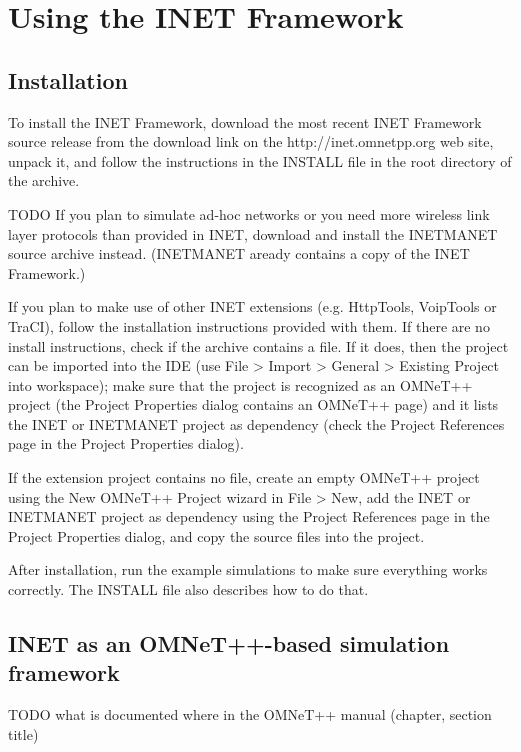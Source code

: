 \chapter{Using the INET Framework}
\label{cha:usage}

\section{Installation}

To install the INET Framework, download the most recent INET Framework source
release from the download link on the http://inet.omnetpp.org web site,
unpack it, and follow the instructions in the INSTALL file in the root
directory of the archive.

\ifdraft TODO
If you plan to simulate ad-hoc networks or you need more wireless link layer
protocols than provided in INET, download and install the INETMANET source
archive instead. (INETMANET aready contains a copy of the INET Framework.)

If you plan to make use of other INET extensions (e.g. HttpTools, VoipTools or TraCI),
follow the installation instructions provided with them. If there are no
install instructions, check if the archive contains a  file.
If it does, then the project can be imported into the IDE (use File > Import >
General > Existing Project into workspace); make sure that the project is recognized
as an OMNeT++ project (the Project Properties dialog contains an OMNeT++ page)
and it lists the INET or INETMANET project as dependency (check the Project References
page in the Project Properties dialog).

If the extension project contains no  file, create an empty OMNeT++
project using the New OMNeT++ Project wizard in File > New, add the INET or INETMANET
project as dependency using the Project References page in the Project Properties dialog,
and copy the source files into the project.
\fi

After installation, run the example simulations to make sure everything works
correctly. The INSTALL file also describes how to do that.


\section{INET as an OMNeT++-based simulation framework}

\ifdraft TODO
what is documented where in the OMNeT++ manual (chapter, section title)
\fi

